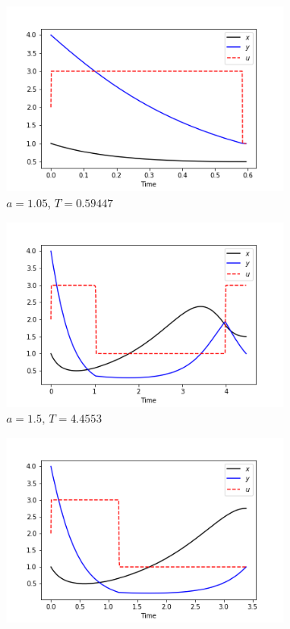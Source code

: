 \documentclass[
	french,
	11pt, %
]{fphw}
\begin{document}
\begin{figure}[H]
    \centering
    \begin{subfigure}[b]{0.32\textwidth}
        \includegraphics[width=\textwidth]{Exo31.png}
        \caption{$a = 1.05$, $T=0.59447$}
    \end{subfigure}
    \begin{subfigure}[b]{0.32\textwidth}
        \includegraphics[width=\textwidth]{Exo32.png}
        \caption{$a = 1.5$, $T=4.4553$}
	\end{subfigure}
    \begin{subfigure}[b]{0.32\textwidth}
        \includegraphics[width=\textwidth]{Exo33.png}

\end{subfigure}
\end{figure}
\end{document}
